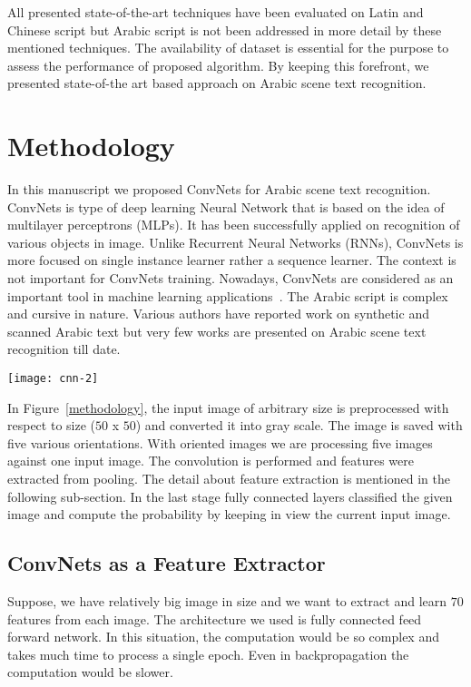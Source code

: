 \documentclass[conference]{IEEEtran}
\begin{document}
All presented state-of-the-art techniques have been evaluated on Latin and Chinese script but Arabic script is not been addressed in more detail by these mentioned techniques. The availability of dataset is essential for the purpose to assess the performance of proposed algorithm.
By keeping this forefront, we presented state-of-the art based approach on Arabic scene text recognition.

\section{Methodology}
In this manuscript we proposed ConvNets for Arabic scene text recognition. 
ConvNets is type of deep learning Neural Network that is based on the idea of multilayer perceptrons (MLPs).
It has been successfully applied on recognition of various objects in image.
Unlike Recurrent Neural Networks (RNNs), ConvNets is more focused on single instance learner rather a sequence learner. 
The context is not important for ConvNets training.
Nowadays, ConvNets are considered as an important tool in machine learning applications~\cite{str3, str4, str5}.
The Arabic script is complex and cursive in nature.
Various authors have reported work on synthetic and scanned Arabic text but very few works are presented on Arabic scene text recognition till date.
\begin{figure*}[h]
\centering
\texttt{[image: cnn-2]}
\caption{\bf Proposed methodology based on ConvNets}
\label{methodology}
\end{figure*}	
In Figure~\ref{methodology}, the input image of arbitrary size is preprocessed with respect to size ($50$ x $50$) and converted it into gray scale. 
The image is saved with five various orientations. 
With oriented images we are processing five images against one input image.
The convolution is performed and features were extracted from pooling.
The detail about feature extraction is mentioned in the following sub-section.
In the last stage fully connected layers classified the given image and compute the probability by keeping in view the current input image.


\subsection{ConvNets as a Feature Extractor}

Suppose, we have relatively big image in size and we want to extract and learn $70$ features from each image. 
The architecture we used is fully connected feed forward network.
In this situation, the computation would be so complex and takes much time to process a single epoch. 
Even in backpropagation the computation would be slower.
\end{document}
